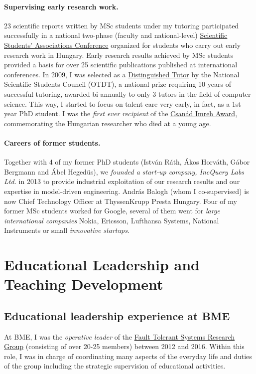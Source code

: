 \documentclass[a4paper,11pt]{report}
\begin{document}
\paragraph{Supervising early research work.} 
23 scientific reports written by MSc students under my tutoring participated successfully in a national two-phase (faculty and national-level) \href{http://www.otdt.hu/hu/cms/otdk/orszagos-tudomanyos-diakkori-konferencia/}{Scientific Students’ Associations Conference} organized for students who carry out early research work in Hungary. Early research results achieved by MSc students provided a basis for over 25 scientific publications published at international conferences. In 2009, I was selected as a \href{http://www.otdt.hu/page/kituntetesek/mak2009.php}{Distinguished Tutor} by the National Scientific Students Council (OTDT), a national prize requiring 10 years of successful tutoring, awarded bi-annually to only 3 tutors in the field of computer science. This way, I started to focus on talent care very early, in fact, as a 1st year PhD student. I was the \emph{first ever recipient} of the \href{https://otdk2017.mik.uni-pannon.hu/index.php/eredmenyek}{Csanád Imreh Award}, commemorating the Hungarian researcher who died %
at a young age. 

\paragraph{Careers of former students.} Together with 4 of my former PhD students (István Ráth, Ákos Horváth, Gábor Bergmann and Ábel Hegedüs), we \emph{founded a start-up company, IncQuery Labs Ltd.} in 2013 to provide industrial exploitation of our research results and our expertise in model-driven engineering. András Balogh (whom I co-supervised) is now Chief Technology Officer at ThyssenKrupp Presta Hungary. Four of my former MSc students worked for Google, several of them went for \emph{large international companies} Nokia, Ericsson, Lufthansa Systems, National Instruments or small \emph{innovative startups}.


\section{Educational Leadership and Teaching Development}


\subsection{Educational leadership experience at BME}
At BME, I was the \emph{operative leader} of the \href{http://inf.mit.bme.hu/en/}{Fault Tolerant Systems Research Group} (consisting of over 20-25 members) between 2012 and 2016. Within this role, I was in charge of coordinating many aspects of the everyday life and duties of the group including the strategic supervision of educational activities. 
\end{document}
